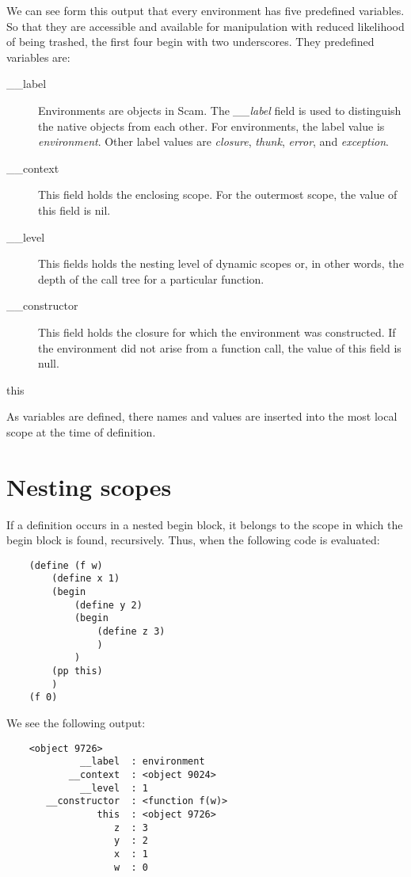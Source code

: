 We can see form this output that every environment
has five predefined variables. So that they are accessible
and available for manipulation with reduced
likelihood of being trashed, the first four begin with
two underscores. They predefined variables are:

\begin{description}
\item[\_\_label]
    Environments are objects in Scam.
    The {\it \_\_label} field is used to distinguish the native objects from
    each other. For environments, the label value is {\it environment}.
    Other label values are {\it closure}, {\it thunk}, {\it error},
    and {\it exception}.
\item[\_\_context]
    This field holds the enclosing scope. For the outermost scope,
    the value of this field is nil.
\item[\_\_level]
    This fields holds the nesting level of dynamic scopes or, in 
    other words, the depth of the call tree for a particular function.
\item[\_\_constructor]
    This field holds the closure for which the environment was constructed.
    If the environment did not arise from a function call, the value of
    this field is null.
\item[this]
\end{description}


As variables are defined, there names and values are inserted
into the most local scope at the time of definition.

\section{Nesting scopes}

If a definition occurs in 
a nested begin block, it belongs to the scope in which the
begin block is found, recursively. Thus, when the following
code is evaluated:

\begin{verbatim}
    (define (f w)
        (define x 1)
        (begin
            (define y 2)
            (begin
                (define z 3)
                )
            )
        (pp this)
        )
    (f 0)
\end{verbatim}

We see the following output:

\begin{verbatim}
    <object 9726>
             __label  : environment
           __context  : <object 9024>
             __level  : 1
       __constructor  : <function f(w)>
                this  : <object 9726>
                   z  : 3
                   y  : 2
                   x  : 1
                   w  : 0
\end{verbatim}

